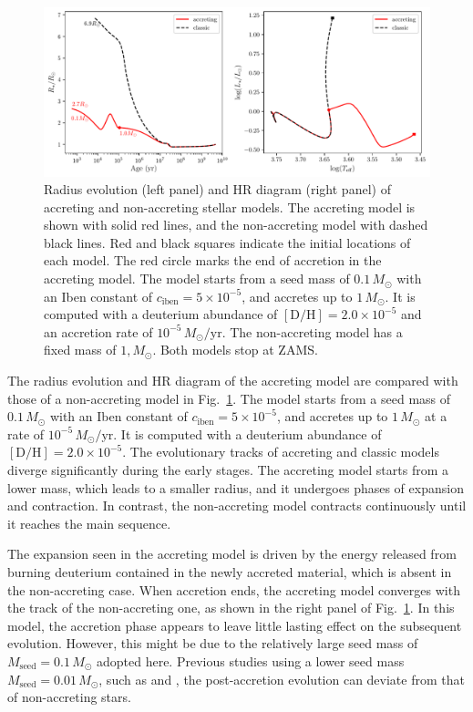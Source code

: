 \documentclass[12pt,a4paper]{article}
\newcommand{\mr}{\mathrm}
\begin{document}
\begin{figure}
  \centering
  \includegraphics[width=.95\textwidth,keepaspectratio]{m1_cmp_acc.pdf}
  \caption{Radius evolution (left panel) and HR diagram (right panel) of accreting and non-accreting stellar models. The accreting model is shown with solid red lines, and the non-accreting model with dashed black lines. Red and black squares indicate the initial locations of each model. The red circle marks the end of accretion in the accreting model. The model starts from a seed mass of $0.1\,M_\odot$ with an Iben constant of $c_\mr{iben} = 5\times10^{-5}$, and accretes up to $1\,M_\odot$. It is computed with a deuterium abundance of $[\mr{D/H}] = 2.0\times 10^{-5}$ and an accretion rate of $10^{-5}\,M_\odot/\mr{yr}$. The non-accreting model has a fixed mass of $1,M_\odot$. Both models stop at ZAMS.}
  \label{fig:comp_accrete_m1}
\end{figure}

The radius evolution and HR diagram of the accreting model are compared with those of a non-accreting model in Fig.~\ref{fig:comp_accrete_m1}.  The model starts from a seed mass of $0.1\,M_\odot$ with an Iben constant of $c_\mr{iben} = 5\times10^{-5}$, and accretes up to $1\,M_\odot$ at a rate of $10^{-5}\,M_\odot/\mr{yr}$. It is computed with a deuterium abundance of $[\mr{D/H}] = 2.0\times 10^{-5}$. The evolutionary tracks of accreting and classic models diverge significantly during the early stages. The accreting model starts from a lower mass, which leads to a smaller radius, and it undergoes phases of expansion and contraction. In contrast, the non-accreting model contracts continuously until it reaches the main sequence.

The expansion seen in the accreting model is driven by the energy released from burning deuterium contained in the newly accreted material, which is absent in the non-accreting case. When accretion ends, the accreting model converges with the track of the non-accreting one, as shown in the right panel of Fig.~\ref{fig:comp_accrete_m1}. In this model, the accretion phase appears to leave little lasting effect on the subsequent evolution. However, this might be due to the relatively large seed mass of $M_\mr{seed} = 0.1\,M_\odot$ adopted here. Previous studies using a lower seed mass $M_\mr{seed} = 0.01\,M_\odot$, such as \textcite{KunitomoEtAl2017} and \textcite{AmardMatt2023}, the post-accretion evolution can deviate from that of non-accreting stars. 
\end{document}
